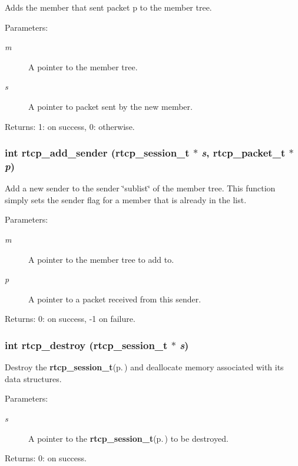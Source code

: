 Adds the member that sent packet p to the member tree. \begin{Desc}
\item[Parameters:]
\begin{description}
\item[{\em m}]A pointer to the member tree. \item[{\em s}]A pointer to packet sent by the new member. \end{description}
\end{Desc}
\begin{Desc}
\item[Returns:]1: on success, 0: otherwise. \end{Desc}
\subsubsection{\setlength{\rightskip}{0pt plus 5cm}int rtcp\_\-add\_\-sender ({\bf rtcp\_\-session\_\-t} $\ast$ {\em s}, {\bf rtcp\_\-packet\_\-t} $\ast$ {\em p})}\label{rtcp_8c_a8}


Add a new sender to the sender \char`\"{}sublist\char`\"{} of the member tree. This function simply sets the sender flag for a member that is already in the list. \begin{Desc}
\item[Parameters:]
\begin{description}
\item[{\em m}]A pointer to the member tree to add to. \item[{\em p}]A pointer to a packet received from this sender. \end{description}
\end{Desc}
\begin{Desc}
\item[Returns:]0: on success, -1 on failure. \end{Desc}
\subsubsection{\setlength{\rightskip}{0pt plus 5cm}int rtcp\_\-destroy ({\bf rtcp\_\-session\_\-t} $\ast$ {\em s})}\label{rtcp_8c_a1}


Destroy the {\bf rtcp\_\-session\_\-t}{\rm (p.\,\pageref{structrtcp__session__t})} and deallocate memory associated with its data structures. \begin{Desc}
\item[Parameters:]
\begin{description}
\item[{\em s}]A pointer to the {\bf rtcp\_\-session\_\-t}{\rm (p.\,\pageref{structrtcp__session__t})} to be destroyed. \end{description}
\end{Desc}
\begin{Desc}
\item[Returns:]0: on success. \end{Desc}
